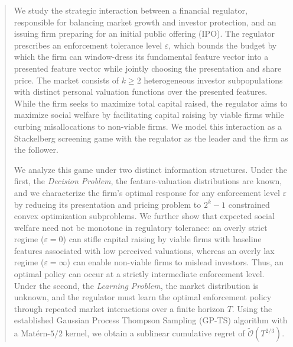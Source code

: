 \begin{abstract}
We study the strategic interaction between a financial regulator, responsible for balancing market growth and investor protection, and an issuing firm preparing for an initial public offering (IPO). The regulator prescribes an enforcement tolerance level $\varepsilon$, which bounds the budget by which the firm can window-dress its fundamental feature vector into a presented feature vector while jointly choosing the presentation and share price. The market consists of $k \ge 2$ heterogeneous investor subpopulations with distinct personal valuation functions over the presented features. While the firm seeks to maximize total capital raised, the regulator aims to maximize social welfare by facilitating capital raising by viable firms while curbing misallocations to non-viable firms. We model this interaction as a Stackelberg screening game with the regulator as the leader and the firm as the follower.

We analyze this game under two distinct information structures. Under the first, the \emph{Decision Problem}, the feature-valuation distributions are known, and we characterize the firm's optimal response for any enforcement level $\varepsilon$ by reducing its presentation and pricing problem to $2^k-1$ constrained convex optimization subproblems. We further show that expected social welfare need not be monotone in regulatory tolerance: an overly strict regime ($\varepsilon = 0$) can stifle capital raising by viable firms with baseline features associated with low perceived valuations, whereas an overly lax regime ($\varepsilon = \infty$) can enable non-viable firms to mislead investors. Thus, an optimal policy can occur at a strictly intermediate enforcement level. Under the second, the \emph{Learning Problem}, the market distribution is unknown, and the regulator must learn the optimal enforcement policy through repeated market interactions over a finite horizon $T$. Using the established Gaussian Process Thompson Sampling (GP-TS) algorithm with a Matérn-$5/2$ kernel, we obtain a sublinear cumulative regret of $\widetilde{\mathcal{O}}(T^{2/3})$.
\end{abstract}



